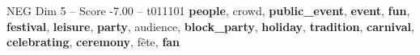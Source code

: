 \begin{textsample}{NEG Dim 5 – Score -7.00 – t011101}  \label{ex:f5_neg_016}
\textbf{people}, crowd, \textbf{public\_event}, \textbf{event}, \textbf{fun}, \textbf{festival}, \textbf{leisure}, \textbf{party}, audience, \textbf{block\_party}, \textbf{holiday}, \textbf{tradition}, \textbf{carnival}, \textbf{celebrating}, \textbf{ceremony}, fête, \textbf{fan}

\end{textsample}
